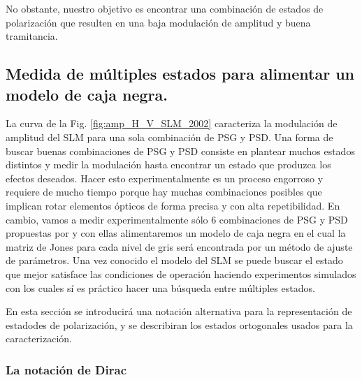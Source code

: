 No obstante, nuestro objetivo es encontrar una combinación de estados
de polarización que resulten en una baja modulación de amplitud y
buena tramitancia. 
\subsection{Medida de múltiples estados para alimentar un modelo de
  caja negra.}
\label{sec:ChGV_med_mod_amp}
La curva de la Fig. \ref{fig:amp_H_V_SLM_2002} caracteriza la modulación de amplitud del SLM para
una sola combinación de PSG y PSD. Una forma de buscar buenas
combinaciones de PSG y PSD consiste en plantear muchos estados
distintos y medir la modulación hasta encontrar un estado que produzca
los efectos deseados. Hacer esto experimentalmente es un proceso
engorroso y requiere de mucho tiempo porque hay muchas combinaciones
posibles que implican rotar elementos ópticos de forma precisa y con
alta repetibilidad. 
En cambio, vamos a medir experimentalmente sólo 6 combinaciones de PSG
y PSD propuestas por  y con
ellas alimentaremos un modelo de caja negra en el cual la matriz de
Jones para cada nivel de gris será encontrada por un método de ajuste
de parámetros.
Una vez conocido el modelo del SLM se puede buscar el
estado que mejor satisface las condiciones de operación haciendo experimentos simulados con
los cuales sí es práctico hacer una búsqueda entre múltiples estados.

En esta sección se introducirá una notación alternativa para la
representación de estadodes de polarización, y se describiran los
estados ortogonales usados para la caracterización. 

\subsubsection{La notación de Dirac}

